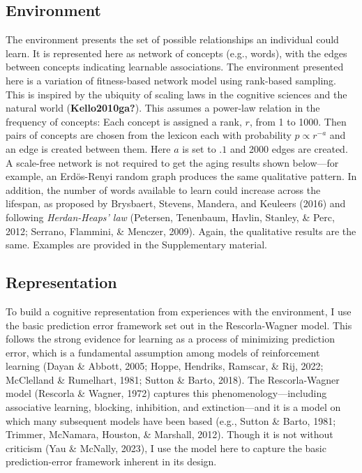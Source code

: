 \documentclass[
  man]{apa6}
\begin{document}
\hypertarget{environment}{%
\subsection{Environment}\label{environment}}

The environment presents the set of possible relationships an individual could learn. It is represented here as network of concepts (e.g., words), with the edges between concepts indicating learnable associations. The environment presented here is a variation of fitness-based network model using rank-based sampling. This is inspired by the ubiquity of scaling laws in the cognitive sciences and the natural world (\textbf{Kello2010ga?}). This assumes a power-law relation in the frequency of concepts: Each concept is assigned a rank, \(r\), from 1 to 1000. Then pairs of concepts are chosen from the lexicon each with probability \(p \propto r^{-a}\) and an edge is created between them. Here \(a\) is set to \(.1\) and 2000 edges are created. A scale-free network is not required to get the aging results shown below---for example, an Erdös-Renyi random graph produces the same qualitative pattern. In addition, the number of words available to learn could increase across the lifespan, as proposed by Brysbaert, Stevens, Mandera, and Keuleers (2016) and following \emph{Herdan-Heaps' law} (Petersen, Tenenbaum, Havlin, Stanley, \& Perc, 2012; Serrano, Flammini, \& Menczer, 2009). Again, the qualitative results are the same. Examples are provided in the Supplementary material.

\hypertarget{representation}{%
\subsection{Representation}\label{representation}}

To build a cognitive representation from experiences with the environment, I use the basic prediction error framework set out in the Rescorla-Wagner model. This follows the strong evidence for learning as a process of minimizing prediction error, which is a fundamental assumption among models of reinforcement learning (Dayan \& Abbott, 2005; Hoppe, Hendriks, Ramscar, \& Rij, 2022; McClelland \& Rumelhart, 1981; Sutton \& Barto, 2018). The Rescorla-Wagner model (Rescorla \& Wagner, 1972) captures this phenomenology---including associative learning, blocking, inhibition, and extinction---and it is a model on which many subsequent models have been based (e.g., Sutton \& Barto, 1981; Trimmer, McNamara, Houston, \& Marshall, 2012). Though it is not without criticism (Yau \& McNally, 2023), I use the model here to capture the basic prediction-error framework inherent in its design.
\end{document}
